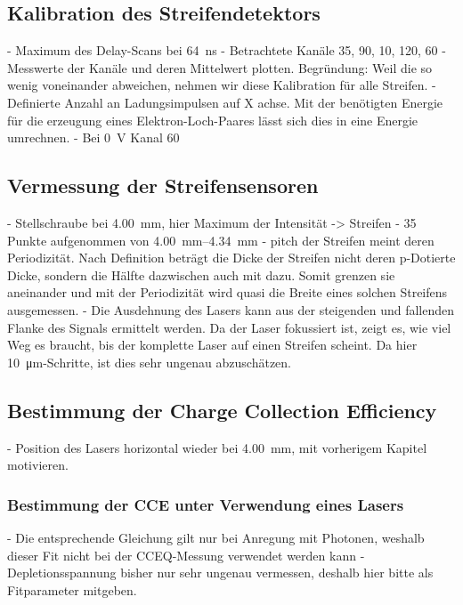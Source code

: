 \subsection{Kalibration des Streifendetektors}
\label{sec:Kalibration-Auswertung}

- Maximum des Delay-Scans bei \SI{64}{\nano\second}
- Betrachtete Kanäle 35, 90, 10, 120, 60
- Messwerte der Kanäle und deren Mittelwert plotten. Begründung:
Weil die so wenig voneinander abweichen, nehmen wir diese Kalibration für alle Streifen.
- Definierte Anzahl an Ladungsimpulsen auf X achse. Mit der benötigten Energie
für die erzeugung eines Elektron-Loch-Paares lässt sich dies in eine Energie umrechnen.
- Bei \SI{0}{\volt} Kanal 60

\subsection{Vermessung der Streifensensoren}
\label{sec:Vermessung-Auswertung}

- Stellschraube bei \SI{4.00}{\milli\meter}, hier Maximum der Intensität -> Streifen
- 35 Punkte aufgenommen von \SIrange{4.00}{4.34}{\milli\meter}
- pitch der Streifen meint deren Periodizität. Nach Definition beträgt die Dicke der
Streifen nicht deren p-Dotierte Dicke, sondern die Hälfte dazwischen auch mit dazu.
Somit grenzen sie aneinander und mit der Periodizität wird quasi die Breite eines
solchen Streifens ausgemessen.
- Die Ausdehnung des Lasers kann aus der steigenden und fallenden Flanke des Signals
ermittelt werden. Da der Laser fokussiert ist, zeigt es, wie viel Weg es braucht,
bis der komplette Laser auf einen Streifen scheint. Da hier \SI{10}{\micro\meter}-Schritte,
ist dies sehr ungenau abzuschätzen.

\subsection{Bestimmung der Charge Collection Efficiency}
\label{sec:CCE-Auswertung}

- Position des Lasers horizontal wieder bei \SI{4.00}{\milli\meter}, mit vorherigem
Kapitel motivieren.

\subsubsection{Bestimmung der CCE unter Verwendung eines Lasers}
\label{sec:CCEL-Auswertung}

- Die entsprechende Gleichung gilt nur bei Anregung mit Photonen, weshalb dieser Fit
nicht bei der CCEQ-Messung verwendet werden kann
- Depletionsspannung bisher nur sehr ungenau vermessen, deshalb hier bitte als
Fitparameter mitgeben.

